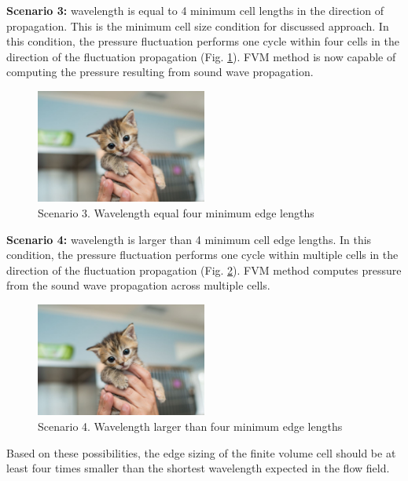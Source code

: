 \textbf{Scenario 3:} wavelength is equal to 4 minimum cell lengths in the direction of propagation. This is the minimum cell size condition for discussed approach. In this condition, the pressure fluctuation performs one cycle within four cells in the direction of the fluctuation propagation (Fig. \ref{scen3}). FVM method is now capable of computing the pressure resulting from sound wave propagation.

\begin{figure}[h!]
\centering %
\includegraphics[width=0.5\textwidth]{Pictures/kitten-placeholder.jpg}
\caption{Scenario 3. Wavelength equal four minimum edge lengths}
\label{scen3}
\end{figure}

\textbf{Scenario 4:} wavelength is larger than 4 minimum cell edge lengths. In this condition, the pressure fluctuation performs one cycle within multiple cells in the direction of the fluctuation propagation (Fig. \ref{scen4}). FVM method computes pressure from the sound wave propagation across multiple cells.

\begin{figure}[h!]
\centering %
\includegraphics[width=0.5\textwidth]{Pictures/kitten-placeholder.jpg}
\caption{Scenario 4. Wavelength larger than four minimum edge lengths}
\label{scen4}
\end{figure}

Based on these possibilities, the edge sizing of the finite volume cell should be at least four times smaller than the shortest wavelength expected in the flow field.

